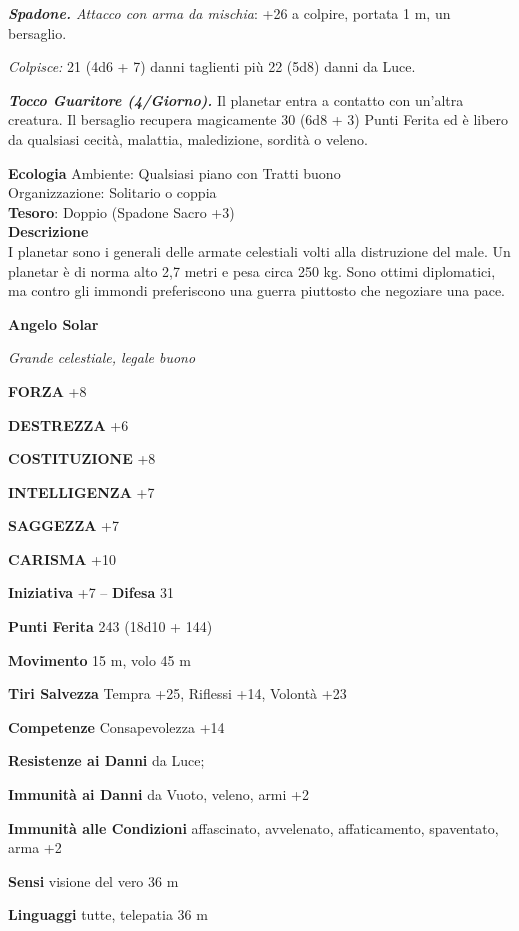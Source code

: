 \begin{multicols}{2}
	\textit{\textbf{Spadone.} Attacco con arma da mischia}: +26 a colpire, portata 1 m, un bersaglio.

	\textit{Colpisce:} 21 (4d6 + 7) danni taglienti più 22 (5d8) danni da Luce.

	\textit{\textbf{Tocco Guaritore (4/Giorno).}} Il planetar entra a contatto con un'altra creatura. Il bersaglio recupera magicamente 30 (6d8 + 3) Punti Ferita ed è libero da qualsiasi cecità, malattia, maledizione, sordità o veleno.

	\textbf{Ecologia}
	Ambiente: Qualsiasi piano con Tratti buono\\
	Organizzazione: Solitario o coppia\\
	\textbf{Tesoro}: Doppio (Spadone Sacro +3)\\
	\textbf{Descrizione}\\
	I planetar sono i generali delle armate celestiali volti alla distruzione del male. Un planetar è di norma alto 2,7 metri e pesa circa 250 kg. Sono ottimi diplomatici, ma contro gli immondi preferiscono una guerra piuttosto che negoziare una pace.


	\medskip{}\textbf{Angelo Solar}

	\textit{Grande celestiale, legale buono}

	\textbf{FORZA} +8

	\textbf{DESTREZZA} +6

	\textbf{COSTITUZIONE} +8

	\textbf{INTELLIGENZA} +7

	\textbf{SAGGEZZA} +7

	\textbf{CARISMA} +10

	\textbf{Iniziativa} +7 -- \textbf{Difesa} 31

	\textbf{Punti Ferita} 243 (18d10 + 144)

	\textbf{Movimento} 15 m, volo 45 m

	\textbf{Tiri Salvezza} Tempra +25, Riflessi +14, Volontà +23

	\textbf{Competenze} Consapevolezza +14

	\textbf{Resistenze ai Danni} da Luce;

	\textbf{Immunità ai Danni} da Vuoto, veleno, armi +2

	\textbf{Immunità alle Condizioni} affascinato, avvelenato, affaticamento, spaventato, arma +2

	\textbf{Sensi} visione del vero 36 m

	\textbf{Linguaggi} tutte, telepatia 36 m


\end{multicols}
